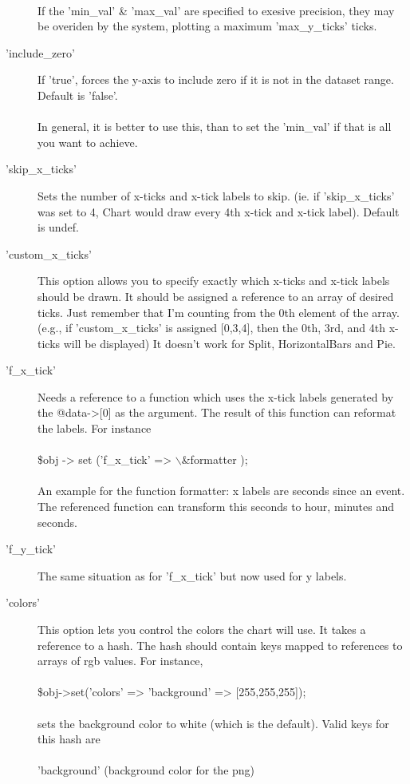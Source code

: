 \begin{description}
\\
If the 'min\_val' \& 'max\_val' are specified to exesive precision, they may be overiden by the system, plotting a maximum 'max\_y\_ticks' ticks. 
\item['include\_zero']If 'true', forces the y-axis to include zero if it is not in the dataset range. Default is 'false'.\\
\\
In general, it is better to use this, than to set the 'min\_val' if that is all you want to achieve.
\item['skip\_x\_ticks']Sets the number of x-ticks and x-tick labels to skip.  (ie. if 'skip\_x\_ticks' was set to 4, Chart would draw every 4th x-tick and x-tick label).  Default is undef.
\item['custom\_x\_ticks']This option allows you to specify exactly which x-ticks and x-tick labels should be drawn. It should be assigned a reference to an array of desired ticks.  Just remember that I'm counting from the 0th element of the array.  (e.g., if 'custom\_x\_ticks' is assigned [0,3,4], then the 0th, 3rd, and 4th x-ticks will be displayed) It doesn't work for Split, HorizontalBars and Pie.
\item['f\_x\_tick']Needs a reference to a function which uses the x-tick labels generated by the @data->[0] as the argument. The result of this function can reformat the labels. For instance\\
\\
\$obj -> set ('f\_x\_tick' => $\backslash$\&formatter );\\
\\
An example for the function formatter: x labels are seconds since an event. The referenced function can transform this seconds to hour, minutes and seconds.
\item['f\_y\_tick']The same situation as for 'f\_x\_tick' but now used for y labels.
\item['colors']This option lets you control the colors the chart will use.  It takes a reference to a hash.  The hash should contain keys mapped to references to arrays of rgb values.  For instance,\\
\\
\$obj->set('colors' => {'background' => [255,255,255]});\\
\\
sets the background color to white (which is the default).  Valid keys for this hash are\\
\\
'background' (background color for the png)\\

\end{description}
